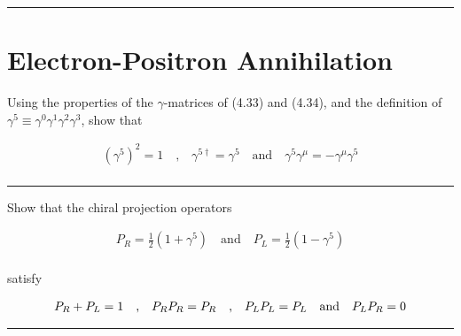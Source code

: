 
\noindent\rule{7in}{2.8pt}
\section{Electron-Positron Annihilation}
    
\begin{problem}{6.1}
Using the properties of the $\gamma$-matrices of (4.33) and (4.34), and the definition of $\gamma^5\equiv\gamma^0\gamma^1\gamma^2\gamma^3$, show that

\begin{align*}
    \left(\gamma^5\right)^2 = 1 \quad \text{,} \quad \gamma^{5\dagger} = \gamma^5 \quad \text{and} \quad \gamma^5\gamma^\mu = - \gamma^\mu\gamma^5 \\
\end{align*}
\end{problem}
\begin{solution}

\end{solution}

\noindent\rule{7in}{1.5pt}


\begin{problem}{6.2}
    Show that the chiral projection operators 

    \begin{align*}
        P_R = \frac{1}{2}\left(1+\gamma^5\right) \quad \text{and} \quad P_L = \frac{1}{2}\left(1-\gamma^5\right)
    \end{align*}\\
    satisfy 

    \begin{align*}
        P_R + P_L = 1 \quad \text{,} \quad P_R P_R = P_R \quad \text{,} \quad P_L P_L = P_L \quad \text{and} \quad P_LP_R = 0 \\
    \end{align*}
\end{problem}
\begin{solution}

\end{solution}

\noindent\rule{7in}{1.5pt}


